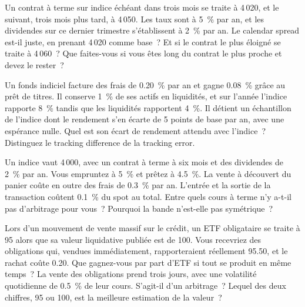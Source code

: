 \begin{question}\label{iq:iv2:etfs-futures-and-index-arbitrage:18}
Un contrat à terme sur indice échéant dans trois mois se traite à 4\,020, et le suivant, trois mois plus tard, à 4\,050. Les taux sont à 5~\% par an, et les dividendes sur ce dernier trimestre s'établissent à 2~\% par an. Le calendar spread est-il juste, en prenant 4\,020 comme base~? Et si le contrat le plus éloigné se traite à 4\,060~? Que faites-vous si vous êtes long du contrat le plus proche et devez le rester~?
\end{question}

\begin{question}\label{iq:iv2:etfs-futures-and-index-arbitrage:19}
Un fonds indiciel facture des frais de 0.20~\% par an et gagne 0.08~\% grâce au prêt de titres. Il conserve 1~\% de ses actifs en liquidités, et sur l'année l'indice rapporte 8~\% tandis que les liquidités rapportent 4~\%. Il détient un échantillon de l'indice dont le rendement s'en écarte de 5 points de base par an, avec une espérance nulle. Quel est son écart de rendement attendu avec l'indice~? Distinguez le tracking difference de la tracking error.
\end{question}

\begin{question}\label{iq:iv2:etfs-futures-and-index-arbitrage:20}
Un indice vaut 4\,000, avec un contrat à terme à six mois et des dividendes de 2~\% par an. Vous empruntez à 5~\% et prêtez à 4.5~\%. La vente à découvert du panier coûte en outre des frais de 0.3~\% par an. L'entrée et la sortie de la transaction coûtent 0.1~\% du spot au total. Entre quels cours à terme n'y a-t-il pas d'arbitrage pour vous~? Pourquoi la bande n'est-elle pas symétrique~?
\end{question}

\begin{question}\label{iq:iv2:etfs-futures-and-index-arbitrage:21}
Lors d'un mouvement de vente massif sur le crédit, un ETF obligataire se traite à 95 alors que sa valeur liquidative publiée est de 100. Vous recevriez des obligations qui, vendues immédiatement, rapporteraient réellement 95.50, et le rachat coûte 0.20. Que gagnez-vous par part d'ETF si tout se produit en même temps~? La vente des obligations prend trois jours, avec une volatilité quotidienne de 0.5~\% de leur cours. S'agit-il d'un arbitrage~? Lequel des deux chiffres, 95 ou 100, est la meilleure estimation de la valeur~?
\end{question}

